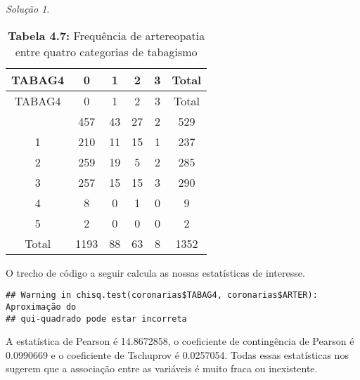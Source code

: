 \documentclass[
]{latex/krantz}
\newenvironment{Shaded}{\begin{snugshade}}{\end{snugshade}}
\newcommand{\DecValTok}[1]{\textcolor[rgb]{0.00,0.00,0.81}{#1}}
\newcommand{\FunctionTok}[1]{\textcolor[rgb]{0.13,0.29,0.53}{\textbf{#1}}}
\newcommand{\NormalTok}[1]{#1}
\newcommand{\OtherTok}[1]{\textcolor[rgb]{0.56,0.35,0.01}{#1}}
\newcommand{\SpecialCharTok}[1]{\textcolor[rgb]{0.81,0.36,0.00}{\textbf{#1}}}
\theoremstyle{definition}
\theoremstyle{definition}
\theoremstyle{definition}
\theoremstyle{definition}
\theoremstyle{remark}
\newtheorem*{solution}{Solução}
\begin{document}
\begin{solution}
\begin{longtable}[]{@{}cccccc@{}}
\caption{\textbf{Tabela 4.7:} Frequência de artereopatia entre quatro categorias de tabagismo}\tabularnewline
\toprule\noalign{}
TABAG4 & 0 & 1 & 2 & 3 & Total \\
\midrule\noalign{}
\endfirsthead
\toprule\noalign{}
TABAG4 & 0 & 1 & 2 & 3 & Total \\
\midrule\noalign{}
\endhead
\bottomrule\noalign{}
\endlastfoot
0 & 457 & 43 & 27 & 2 & 529 \\
1 & 210 & 11 & 15 & 1 & 237 \\
2 & 259 & 19 & 5 & 2 & 285 \\
3 & 257 & 15 & 15 & 3 & 290 \\
4 & 8 & 0 & 1 & 0 & 9 \\
5 & 2 & 0 & 0 & 0 & 2 \\
Total & 1193 & 88 & 63 & 8 & 1352 \\
\end{longtable}

O trecho de código a seguir calcula as nossas estatísticas de interesse.

\begin{Shaded}
\end{Shaded}

\begin{verbatim}
## Warning in chisq.test(coronarias$TABAG4, coronarias$ARTER): Aproximação do
## qui-quadrado pode estar incorreta
\end{verbatim}

\begin{Shaded}
\end{Shaded}

A estatística de Pearson é 14.8672858, o coeficiente de contingência de Pearson é 0.0990669 e o coeficiente de Tschuprov é 0.0257054. Todas essas estatísticas nos sugerem que a associação entre as variáveis é muito fraca ou inexistente.
\end{solution}
\end{document}
